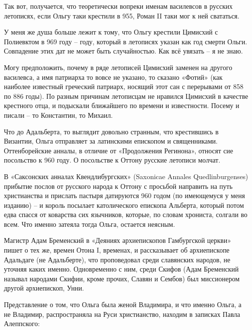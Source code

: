 Так вот, получается, что теоретически вопреки именам василевсов в русских летописях, если Ольгу таки крестили в 955, Роман II таки мог к ней свататься.

У меня же душа больше лежит к тому, что Ольгу крестили Цимисхий с Полиевктом в 969 году – году, который в летописях указан как год смерти Ольги. Совпадение этих дат не может быть случайностью. Как всё увязать – я не знаю. 

Могу предположить, почему в ряде летописей Цимисхий заменен на другого василевса, а имя патриарха то вовсе не указано, то сказано «Фотий» (как наиболее известный греческий патриарх, носящий этот сан с перерывами от 858 по 886 годы). По разным причинам летописцам не нравился Цимисхий в качестве крестного отца, и подыскали ближайшего по времени и известности. Посему и писали – то Константин, то Михаил.

Что до Адальберта, то выглядит довольно странным, что крестившись в Византии, Ольга отправляет за латинскими епископом и священниками. Оттенборейские анналы, в отличие от «Продолжения Регинона», относят сие посольство к 960 году. О посольстве к Оттону русские летописи молчат.

В «Саксонских анналах Квендлибургских» (Saxonicae Annal\-es Quedlinburgenses) прибытие послов от русского народа к Оттону с просьбой направить на путь христианства и прислать пастыря датируются 960 годом (по имеющемуся у меня изданию) – и король посылает католического епископа Альберта, который потом едва спасся от коварства сих язычников, которые, по словам хрониста, солгали во всем. Что именно затеяла тогда Ольга, остается неясным.

Магистр Адам Бременский в «Деяниях архиепископов Гамбургской церкви» пишет о тех же, времен Отона I, временах, и рассказывает об архиепископе Адальдаге (не Адальберте), что проповедовал среди славянских народов, не уточняя каких именно. Одновременно с ним, среди Скифов (Адам Бременский называл народами Скифии, кроме прочих, Славян и Сембов) был миссионером другой архиепископ, Унни. 

Представление о том, что Ольга была женой Владимира, и что именно Ольга, а не Владимир, распространяла на Руси христианство, находим в записках Павла Алеппского\cite{sbornikmat}: 

